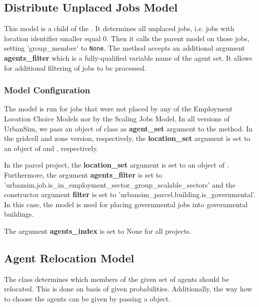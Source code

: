 \subsection{Distribute Unplaced Jobs Model}
%
\label{sec:distribute-unplaced-jobs-model} 
%
This model is a child of the . It determines all unplaced jobs, i.e.
 jobs with location identifier smaller equal 0. Then it calls the parent model on those jobs, setting 
 'group_member' to \verb|None|. The  method accepts an additional argument 
 {\bf agents_filter} which is a fully-qualified variable name of the agent set. It allows for additional filtering 
 of jobs to be processed.

\subsubsection{Model Configuration}
% 
The model is run for jobs that were not placed by 
any of the Employment Location Choice Models nor by the Scaling Jobs Model. 
In all versions of UrbanSim, we pass an object of class  as {\bf agent_set} 
argument to the  method. In the gridcell and zone version, respectively, the {\bf location_set} argument 
is set to an object of  and , respectively.

In the parcel project, the {\bf location_set} argument is set to an object of . 
Furthermore, the argument {\bf agents_filter} is set to 'urbansim.job.is_in_employment_sector_group_scalable_sectors' 
and the constructor argument {\bf filter} is set to 'urbansim_parcel.building.is_governmental'. In this case, the model
is used for placing governmental jobs into governmental buildings.

The argument {\bf agents_index} is set to None for all projects. 


%
\subsection{Agent Relocation Model}
%
\label{sec:agent-relocation-model}

The class  
determines which members of the given
set of agents should be relocated. This is done on basis of given
probabilities. Additionally, the way how to choose the agents can be given by
passing a  object.

